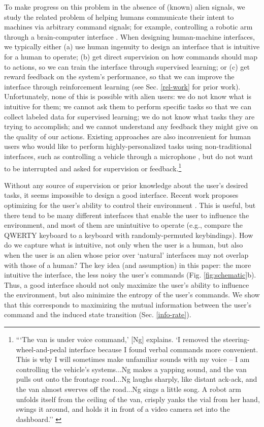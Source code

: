 \documentclass{article}
\begin{document}
To make progress on this problem in the absence of (known) alien signals, we study the related problem of helping humans communicate their intent to machines via arbitrary command signals; for example, controlling a robotic arm through a brain-computer interface \cite{muelling2015autonomy}.
When designing human-machine interfaces, we typically either (a) use human ingenuity to design an interface that is intuitive for a human to operate; (b) get direct supervision on how commands should map to actions, so we can train the interface through supervised learning; or (c) get reward feedback on the system's performance, so that we can improve the interface through reinforcement learning (see Sec. \ref{rel-work} for prior work).
Unfortunately, none of this is possible with alien users: we do not know what is intuitive for them; we cannot ask them to perform specific tasks so that we can collect labeled data for supervised learning; we do not know what tasks they are trying to accomplish; and we cannot understand any feedback they might give on the quality of our actions.
Existing approaches are also inconvenient for human users who would like to perform highly-personalized tasks using non-traditional interfaces, such as controlling a vehicle through a microphone \cite{stephenson2003snow}, but do not want to be interrupted and asked for supervision or feedback.\footnote{```The van is under voice command,' [Ng] explains. `I removed the steering-wheel-and-pedal interface because I found verbal commands more convenient. This is why I will sometimes make unfamiliar sounds with my voice -- I am controlling the vehicle's systems...Ng makes a yapping sound, and the van pulls out onto the frontage road...Ng laughs sharply, like distant ack-ack, and the van almost swerves off the road...Ng sings a little song. A robot arm unfolds itself from the ceiling of the van, crisply yanks the vial from her hand, swings it around, and holds it in front of a video camera set into the dashboard.'' \cite{stephenson2003snow}}

Without any source of supervision or prior knowledge about the user's desired tasks, it seems impossible to design a good interface.
Recent work proposes optimizing for the user's ability to control their environment \cite{du2020ave}.
This is useful, but there tend to be many different interfaces that enable the user to influence the environment, and most of them are unintuitive to operate (e.g., compare the QWERTY keyboard to a keyboard with randomly-permuted keybindings).
How do we capture what is intuitive, not only when the user is a human, but also when the user is an alien whose prior over `natural' interfaces may not overlap with those of a human?
The key idea (and assumption) in this paper: the more intuitive the interface, the less noisy the user's commands (Fig. \ref{fig:schematic}b).
Thus, a good interface should not only maximize the user's ability to influence the environment, but also minimize the entropy of the user's commands.
We show that this corresponds to maximizing the mutual information between the user's command and the induced state transition (Sec. \ref{info-rate}).
\end{document}

